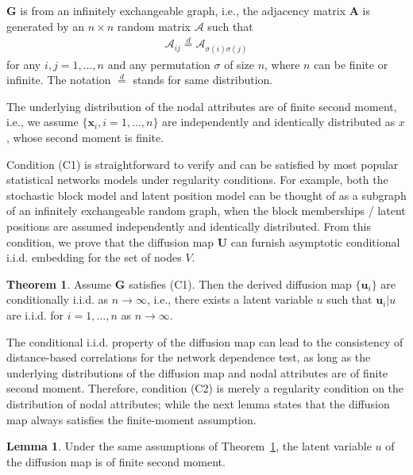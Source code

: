 \documentclass[11pt]{article}
\theoremstyle{definition}
\newtheorem{theorem}{Theorem}
\newtheorem{lemma}{Lemma}
\begin{document}
\begin{description}[align=left]
\item [(C1)] $\mathbf{G}$ is from an infinitely exchangeable graph, i.e., the adjacency matrix $\mathbf{A}$ is generated by an $n \times n$ random matrix $\mathcal{A}$ such that 
\begin{align*}
\mathcal{A}_{ij} \stackrel{d}{=} \mathcal{A}_{\sigma(i) \sigma(j)}
\end{align*}
for any $i,j=1,\ldots,n$ and any permutation $\sigma$ of size $n$, where $n$ can be finite or infinite. The notation $\stackrel{d}{=}$ stands for same distribution. 

\item [(C2)] The underlying distribution of the nodal attributes are of finite second moment, i.e., we assume $\{\mathbf{x}_{i},i=1,\ldots,n\}$ are independently and identically distributed as $x$, whose second moment is finite.
\end{description}

Condition (C1) is straightforward to verify and can be satisfied by most popular statistical networks models under regularity conditions. For example, both the stochastic block model and latent position model can be thought of as a subgraph of an infinitely exchangeable random graph, when the block memberships / latent positions are assumed independently and identically distributed. From this condition, we prove that the diffusion map $\mathbf{U}$ can furnish asymptotic conditional i.i.d. embedding for the set of nodes $V$. 

\begin{theorem}
	\label{main_lemma}
	Assume $\mathbf{G}$ satisfies (C1). Then the derived diffusion map $\{ \mathbf{u}_{i}\}$ are conditionally i.i.d. as $n \rightarrow \infty$,  i.e., there exists a latent variable $u$ such that $\mathbf{u}_{i}|u$ are i.i.d. for $i=1,\ldots,n$ as $n \rightarrow \infty$.  
\end{theorem} 

The conditional i.i.d. property of the diffusion map can lead to the consistency of distance-based correlations for the network dependence test, as long as the underlying distributions of the diffusion map and nodal attributes are of finite second moment. Therefore, condition (C2) is merely a regularity condition on the distribution of nodal attributes; while the next lemma states that the diffusion map always satisfies the finite-moment assumption.

\begin{lemma}
	\label{main_lemma_1}
    Under the same assumptions of Theorem~\ref{main_lemma}, the latent variable $u$ of the diffusion map is of finite second moment. 
\end{lemma} 
\end{document}

